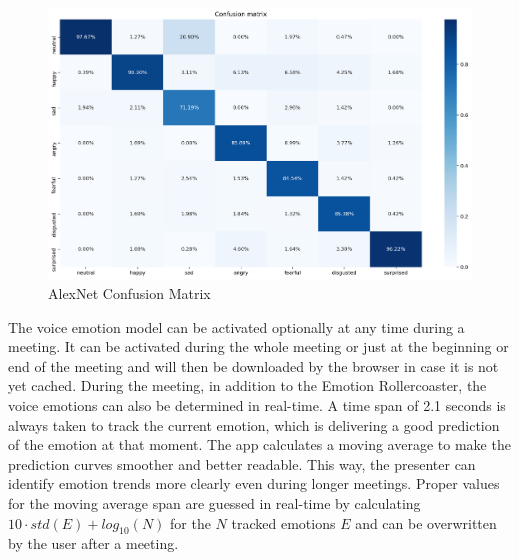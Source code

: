\begin{figure}
\centering
\includegraphics[width=1\textwidth]{assets/alexnet_confusion_matrix.png}
\caption{AlexNet Confusion Matrix}
\label{fig:alexnet_confusion_matrix}
\end{figure}

The voice emotion model can be activated optionally at any time during a meeting. It can be activated during the whole meeting or just at the beginning or end of the meeting and will then be downloaded by the browser in case it is not yet cached. During the meeting, in addition to the Emotion Rollercoaster, the voice emotions can also be determined in real-time. A time span of 2.1 seconds is always taken to track the current emotion, which is delivering a good prediction of the emotion at that moment. The app calculates a moving average to make the prediction curves smoother and better readable. This way, the presenter can identify emotion trends more clearly even during longer meetings. Proper values for the moving average span are guessed in real-time by calculating $10 \cdot std(E) + log_{10}(N)$ for the $N$ tracked emotions $E$ and can be overwritten by the user after a meeting.
